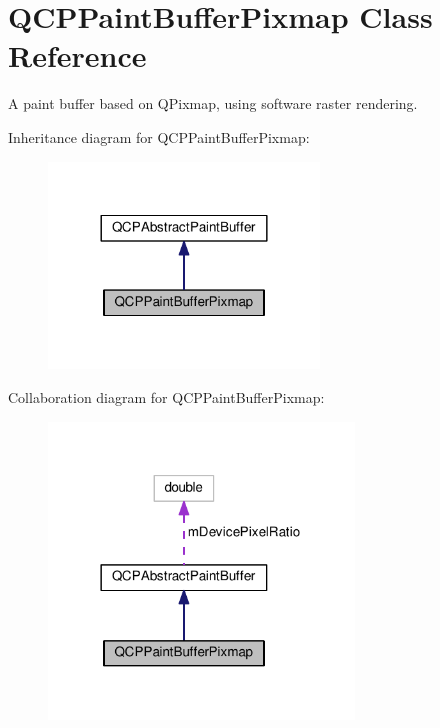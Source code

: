 \hypertarget{classQCPPaintBufferPixmap}{}\section{Q\+C\+P\+Paint\+Buffer\+Pixmap Class Reference}
\label{classQCPPaintBufferPixmap}


A paint buffer based on Q\+Pixmap, using software raster rendering.  




Inheritance diagram for Q\+C\+P\+Paint\+Buffer\+Pixmap\+:
\nopagebreak
\begin{figure}[H]
\begin{center}
\leavevmode
\includegraphics[width=204pt]{classQCPPaintBufferPixmap__inherit__graph}
\end{center}
\end{figure}


Collaboration diagram for Q\+C\+P\+Paint\+Buffer\+Pixmap\+:
\nopagebreak
\begin{figure}[H]
\begin{center}
\leavevmode
\includegraphics[width=230pt]{classQCPPaintBufferPixmap__coll__graph}
\end{center}
\end{figure}
